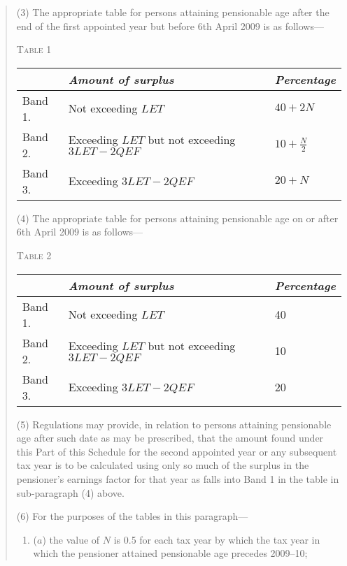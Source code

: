 \documentclass[12pt,a4paper]{article}
\begin{document}
\begin{quotation}
(3) The appropriate table for persons attaining pensionable age after the end of the first appointed year but before 6th April 2009 is as follows—

\medskip

\noindent\textsc{Table 1}

{\noindent\footnotesize
\begin{tabulary}{\linewidth}{JJJ}
\hline
&\itshape Amount of surplus	&\itshape Percentage\\
\hline
Band 1. 	&Not exceeding $LET$	&$40 + 2N$\\
Band 2. 	&Exceeding $LET$ but not exceeding $3LET - 2QEF$	&$10 + \frac{N}{2}$\\
Band 3. 	&Exceeding $3LET - 2QEF$	&$20 + N$\\
\hline
\end{tabulary}

}

\medskip

(4) The appropriate table for persons attaining pensionable age on or after 6th April 2009 is as follows—

\medskip

\noindent\textsc{Table 2}

{\noindent\footnotesize
\begin{tabulary}{\linewidth}{JJJ}
\hline
&\itshape Amount of surplus	&\itshape Percentage\\
\hline
Band 1. 	&Not exceeding $LET$	&40\\
Band 2. 	&Exceeding $LET$ but not exceeding $3LET - 2QEF$	&10\\
Band 3. 	&Exceeding $3LET - 2QEF$	&20\\
\hline
\end{tabulary}

}

\medskip

(5) Regulations may provide, in relation to persons attaining pensionable age after such date as may be prescribed, that the amount found under this Part of this Schedule for the second appointed year or any subsequent tax year is to be calculated using only so much of the surplus in the pensioner’s earnings factor for that year as falls into Band 1 in the table in sub-paragraph (4)  above.

(6) For the purposes of the tables in this paragraph—
\begin{enumerate}\item[]
($a$) the value of $N$ is 0.5 for each tax year by which the tax year in which the pensioner attained pensionable age precedes 2009--10;


\end{enumerate}
\end{quotation}
\end{document}
